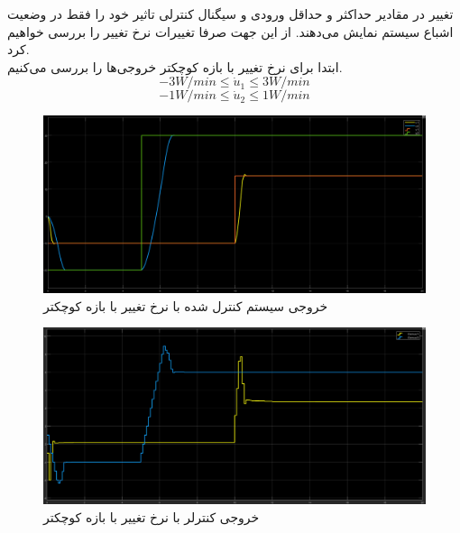 \documentclass[14pt, a4paper]{extarticle}
\begin{document}
\subsubsection{}
تغییر در مقادیر حداکثر و حداقل ورودی و سیگنال کنترلی تاثیر خود را فقط در وضعیت اشباع سیستم نمایش می‌دهند. از این جهت صرفا تغییرات نرخ تغییر را بررسی خواهیم کرد.\\
ابتدا برای نرخ تغییر با بازه کوچکتر خروجی‌ها را بررسی می‌کنیم.\\
\[
-3 W/min \leq \dot{u}_1 \leq 3 W/min
\]
\[
-1 W/min \leq \dot{u}_2 \leq 1 W/min
\]
\begin{figure}[h!]
	\centering
	\includegraphics[scale = 0.3]{Q2_sim_result_consmall.png}
	\caption{خروجی سیستم کنترل شده با
		نرخ تغییر با بازه کوچکتر}
\end{figure}
\begin{figure}[h!]
	\centering
	\includegraphics[scale = 0.3]{Q2_sim_control_consmall.png}
	\caption{خروجی کنترلر با
		نرخ تغییر با بازه کوچکتر}
\end{figure}
\end{document}
